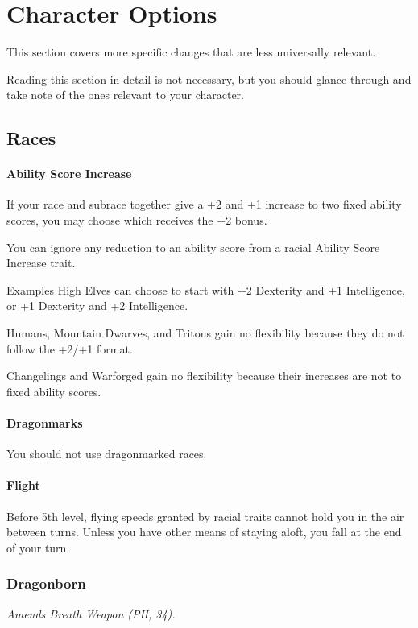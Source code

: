\documentclass[House_Rules.tex]{subfiles}
\begin{document}
\chapter{Character Options}

This section covers more specific changes that are less universally relevant. 

Reading this section in detail is not necessary, but you should glance through and take note of the ones relevant to your character.




\section{Races}

\subsubsection{Ability Score Increase}
If your race and subrace together give a +2 and +1 increase to two fixed ability scores, you may choose which receives the +2 bonus.

You can ignore any reduction to an ability score from a racial Ability Score Increase trait.

\begin{DndComment}{Examples}
High Elves can choose to start with +2 Dexterity and +1 Intelligence, or +1 Dexterity and +2 Intelligence. 

Humans, Mountain Dwarves, and Tritons gain no flexibility because they do not follow the +2/+1 format.

Changelings and Warforged gain no flexibility because their increases are not to fixed ability scores.
\end{DndComment}


\subsubsection{Dragonmarks} You should not use dragonmarked races.

\subsubsection{Flight} Before 5th level, flying speeds granted by racial traits cannot hold you in the air between turns. Unless you have other means of staying aloft, you fall at the end of your turn.

\subsection{Dragonborn}
\textit{Amends Breath Weapon (PH, 34).}
\end{document}
